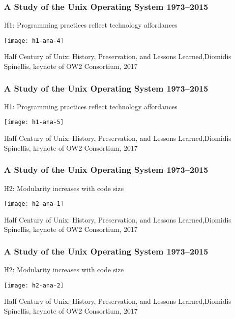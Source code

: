 \begin{frame}[plain]
	\frametitle{A Study of the Unix Operating System 1973–2015}
	\centering
	H1: Programming practices reflect
	technology affordances
	
	\texttt{[image: h1-ana-4]}

	\tiny Half Century of Unix:
History, Preservation, and
Lessons Learned,Diomidis Spinellis, keynote of OW2 Consortium, 2017
	
\end{frame}	



\begin{frame}[plain]
	\frametitle{A Study of the Unix Operating System 1973–2015}
	\centering
	H1: Programming practices reflect
	technology affordances
	
	\texttt{[image: h1-ana-5]}
	
	\tiny Half Century of Unix:
	History, Preservation, and
	Lessons Learned,Diomidis Spinellis, keynote of OW2 Consortium, 2017
	
\end{frame}	



\begin{frame}[plain]
	\frametitle{A Study of the Unix Operating System 1973–2015}
	\centering
	H2: Modularity increases with code
	size
	
	\texttt{[image: h2-ana-1]}
	
	\tiny Half Century of Unix:
	History, Preservation, and
	Lessons Learned,Diomidis Spinellis, keynote of OW2 Consortium, 2017
	
\end{frame}	



\begin{frame}[plain]
	\frametitle{A Study of the Unix Operating System 1973–2015}
	\centering
	H2: Modularity increases with code
	size
	
	\texttt{[image: h2-ana-2]}
	
	\tiny Half Century of Unix:
	History, Preservation, and
	Lessons Learned,Diomidis Spinellis, keynote of OW2 Consortium, 2017
	
\end{frame}	




